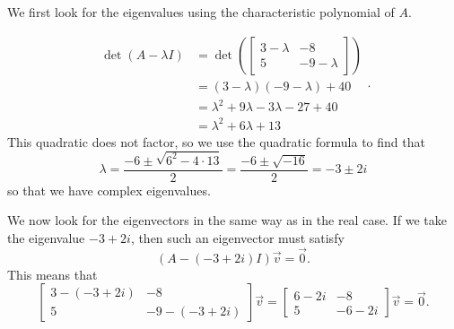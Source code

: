 \documentclass{ximera}
\begin{document}
\begin{exampleSol}
We first look for the eigenvalues using the characteristic polynomial of $A$. 

\[ 
    \begin{split}
        \det(A - \lambda I) &= \det 
        \left( 
        \begin{bmatrix} 
            3-\lambda & -8 \\ 
            5 & -9 -\lambda 
        \end{bmatrix} 
        \right) \\ 
        &= (3-\lambda)(-9-\lambda) + 40 \\
        &= \lambda^2 + 9\lambda - 3\lambda - 27+40 \\
        &= \lambda^2 + 6\lambda + 13
    \end{split}. 
\]
This quadratic does not factor, so we use the quadratic formula to find that 
\[ 
    \lambda = \frac{-6 \pm \sqrt{6^2 - 4\cdot 13}}{2} = \frac{-6 \pm \sqrt{-16}}{2}  = -3\pm 2i 
\] 
so that we have complex eigenvalues. 

We now look for the eigenvectors in the same way as in the real case. If we take the eigenvalue $-3+2i$, then such an eigenvector must satisfy
\[ 
    (A - (-3+2i)I)\vec{v} = \vec{0}. 
\] 
This means that 
\[
    \begin{bmatrix} 
        3-(-3+2i) & -8 \\ 
        5 & -9-(-3+2i) 
    \end{bmatrix}
    \vec{v} = 
    \begin{bmatrix} 
        6-2i & -8 \\ 
        5 & -6-2i 
    \end{bmatrix}
    \vec{v} = \vec{0}. 
\]


\end{exampleSol}
\end{document}
